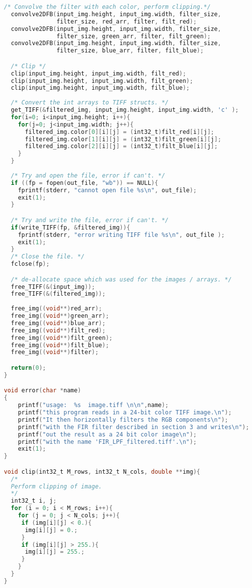 \documentclass{article}
\begin{document}
\begin{lstlisting}[language=C, caption=filter\_image\_section3.c, label={lst:sec3}]
  /* Convolve the filter with each color, perform clipping.*/
  convolve2DFB(input_img.height, input_img.width, filter_size,
               filter_size, red_arr, filter, filt_red);
  convolve2DFB(input_img.height, input_img.width, filter_size,
               filter_size, green_arr, filter, filt_green);
  convolve2DFB(input_img.height, input_img.width, filter_size,
               filter_size, blue_arr, filter, filt_blue);

  /* Clip */
  clip(input_img.height, input_img.width, filt_red);
  clip(input_img.height, input_img.width, filt_green);
  clip(input_img.height, input_img.width, filt_blue);
  
  /* Convert the int arrays to TIFF structs. */
  get_TIFF(&filtered_img, input_img.height, input_img.width, 'c' );
  for(i=0; i<input_img.height; i++){
    for(j=0; j<input_img.width; j++){
      filtered_img.color[0][i][j] = (int32_t)filt_red[i][j];
      filtered_img.color[1][i][j] = (int32_t)filt_green[i][j];
      filtered_img.color[2][i][j] = (int32_t)filt_blue[i][j];
    }
  }
  
  /* Try and open the file, error if can't. */
  if ((fp = fopen(out_file, "wb")) == NULL){
    fprintf(stderr, "cannot open file %s\n", out_file);
    exit(1);
  }

  /* Try and write the file, error if can't. */
  if(write_TIFF(fp, &filtered_img)){
    fprintf(stderr, "error writing TIFF file %s\n", out_file );
    exit(1);
  }
  /* Close the file. */
  fclose(fp);

  /* de-allocate space which was used for the images / arrays. */
  free_TIFF(&(input_img));
  free_TIFF(&(filtered_img));
  
  free_img((void**)red_arr);
  free_img((void**)green_arr);  
  free_img((void**)blue_arr);
  free_img((void**)filt_red);
  free_img((void**)filt_green);
  free_img((void**)filt_blue);
  free_img((void**)filter);

  return(0);
}

void error(char *name)
{
    printf("usage:  %s  image.tiff \n\n",name);
    printf("this program reads in a 24-bit color TIFF image.\n");
    printf("It then horizontally filters the RGB components\n");
    printf("with the FIR filter described in section 3 and writes\n");
    printf("out the result as a 24 bit color image\n");
    printf("with the name 'FIR_LPF_filtered.tiff'.\n");
    exit(1);
}

void clip(int32_t M_rows, int32_t N_cols, double **img){
  /*
  Perform clipping of image.
  */
  int32_t i, j;
  for (i = 0; i < M_rows; i++){
    for (j = 0; j < N_cols; j++){
     if (img[i][j] < 0.){
      img[i][j] = 0.;
     }
     if (img[i][j] > 255.){
      img[i][j] = 255.;
     }
    } 
  }
}


\end{lstlisting}
\end{document}
